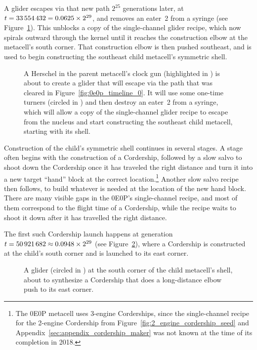 A glider escapes via that new path $2^{25}$ generations later, at $t = 33{\,}554{\,}432 = 0.0625 \times 2^{29}$, and removes an eater~2 from a syringe (see Figure~\ref{fig:0e0p_timeline_33554432}). This unblocks a copy of the single-channel glider recipe, which now spirals outward through the kernel until it reaches the construction elbow at the metacell's south corner. That construction elbow is then pushed southeast, and is used to begin constructing the southeast child metacell's symmetric shell.

\begin{figure}[!htb]
	\centering
	\caption{A Herschel in the parent metacell's clock gun (highlighted in ) is about to create a glider that will escape via the path that was cleared in Figure~\ref{fig:0e0p_timeline_0}. It will use some one-time turners (circled in ) and then destroy an eater~2 from a syringe, which will allow a copy of the single-channel glider recipe to escape from the nucleus and start constructing the southeast child metacell, starting with its shell.}
	\label{fig:0e0p_timeline_33554432}
\end{figure}

Construction of the child's symmetric shell continues in several stages. A stage often begins with the construction of a Cordership, followed by a slow salvo to shoot down the Cordership once it has traveled the right distance and turn it into a new target ``hand'' block at the correct location.\footnote{The 0E0P metacell uses 3-engine Corderships, since the single-channel recipe for the 2-engine Cordership from Figure~\ref{fig:2_engine_cordership_seed} and Appendix~\ref{sec:appendix_cordership_maker} was not known at the time of its completion in 2018.} Another slow salvo recipe then follows, to build whatever is needed at the location of the new hand block. There are many visible gaps in the 0E0P's single-channel recipe, and most of them correspond to the flight time of a Cordership, while the recipe waits to shoot it down after it has travelled the right distance.

The first such Cordership launch happens at generation $t = 50{\,}921{\,}682 \approx 0.0948 \times 2^{29}$ (see Figure~\ref{fig:0e0p_timeline_50921682}), where a Cordership is constructed at the child's south corner and is launched to its east corner.

\begin{figure}[!htb]
	\centering
	\caption{A glider (circled in ) at the south corner of the child metacell's shell, about to synthesize a Cordership that does a long-distance elbow push to its east corner.}
	\label{fig:0e0p_timeline_50921682}
\end{figure}

